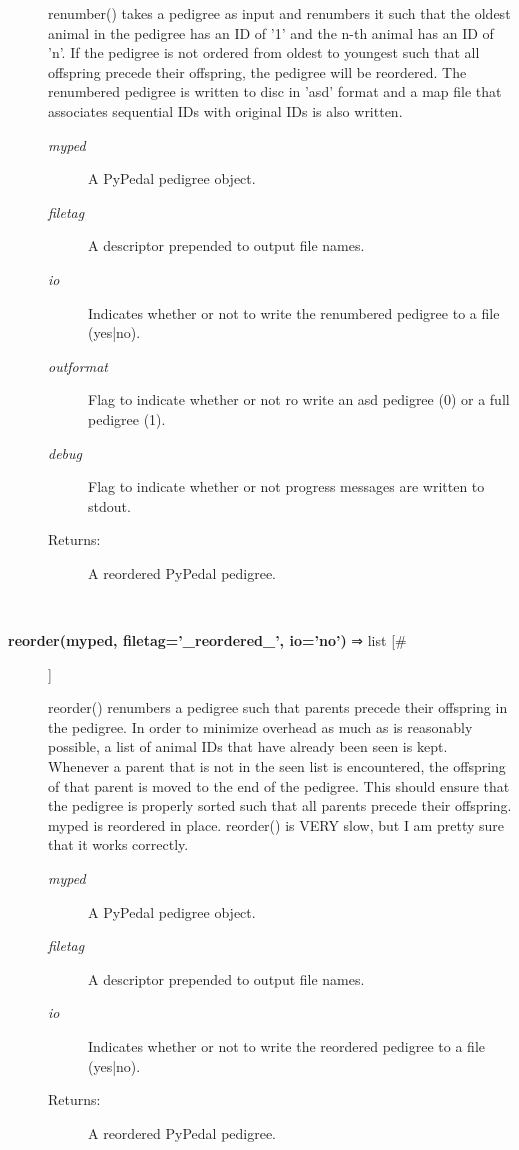 \documentclass[10pt]{article}
\begin{document}
\begin{description}
 renumber() takes a pedigree as input and renumbers it such that the oldest animal in the pedigree has an ID of '1' and the n-th animal has an ID of 'n'. If the pedigree is not ordered from oldest to youngest such that all offspring precede their offspring, the pedigree will be reordered. The renumbered pedigree is written to disc in 'asd' format and a map file that associates sequential IDs with original IDs is also written.
\begin{description}
\item[\emph{myped}
] A PyPedal pedigree object.
\item[\emph{filetag}
] A descriptor prepended to output file names.
\item[\emph{io}
] Indicates whether or not to write the renumbered pedigree to a file (yes|no).
\item[\emph{outformat}
] Flag to indicate whether or not ro write an asd pedigree (0) or a full pedigree (1).
\item[\emph{debug}
] Flag to indicate whether or not progress messages are written to stdout.
\item[Returns:] A reordered PyPedal pedigree.

\end{description}
\\ 

\item[\textbf{reorder(myped, filetag='\_reordered\_', io='no')}
 ⇒ list [\#]]

 reorder() renumbers a pedigree such that parents precede their offspring in the pedigree. In order to minimize overhead as much as is reasonably possible, a list of animal IDs that have already been seen is kept. Whenever a parent that is not in the seen list is encountered, the offspring of that parent is moved to the end of the pedigree. This should ensure that the pedigree is properly sorted such that all parents precede their offspring. myped is reordered in place. reorder() is VERY slow, but I am pretty sure that it works correctly.
\begin{description}
\item[\emph{myped}
] A PyPedal pedigree object.
\item[\emph{filetag}
] A descriptor prepended to output file names.
\item[\emph{io}
] Indicates whether or not to write the reordered pedigree to a file (yes|no).
\item[Returns:] A reordered PyPedal pedigree.

\end{description}
\\ 


\end{description}
\end{document}
